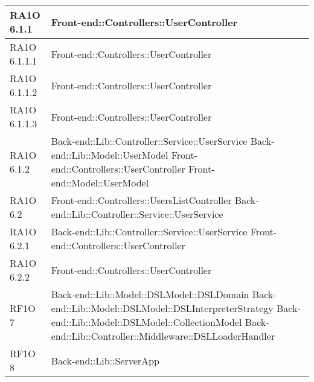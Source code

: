 \begin{center}
\begin{longtable}{ | p{3cm} | p{11cm} | }
    RA1O 6.1.1 & Front-end::Controllers::UserController \newline  \\ \hline     
     
    RA1O 6.1.1.1 & Front-end::Controllers::UserController \newline  \\ \hline
        
    RA1O 6.1.1.2 & Front-end::Controllers::UserController \newline  \\ \hline
        
    RA1O 6.1.1.3 & Front-end::Controllers::UserController \newline  \\ \hline
       
    RA1O 6.1.2 & Back-end::Lib::Controller::Service::UserService \newline Back-end::Lib::Model::UserModel \newline Front-end::Controllers::UserController \newline Front-end::Model::UserModel \newline  \\ \hline     
    
    
    RA1O 6.2 & Front-end::Controllers::UsersListController \newline Back-end::Lib::Controller::Service::UserService \\ \hline     
     
    RA1O 6.2.1 & Back-end::Lib::Controller::Service::UserService \newline Front-end::Controllers::UserController \newline  \\ \hline      
    RA1O 6.2.2 & Front-end::Controllers::UserController \newline  \\ \hline      
      
    RF1O 7 & Back-end::Lib::Model::DSLModel::DSLDomain \newline Back-end::Lib::Model::DSLModel::DSLInterpreterStrategy \newline Back-end::Lib::Model::DSLModel::CollectionModel \newline Back-end::Lib::Controller::Middleware::DSLLoaderHandler \\ \hline      
    
    RF1O 8 & Back-end::Lib::ServerApp \newline  \\ \hline   
       

\end{longtable}
\end{center}
